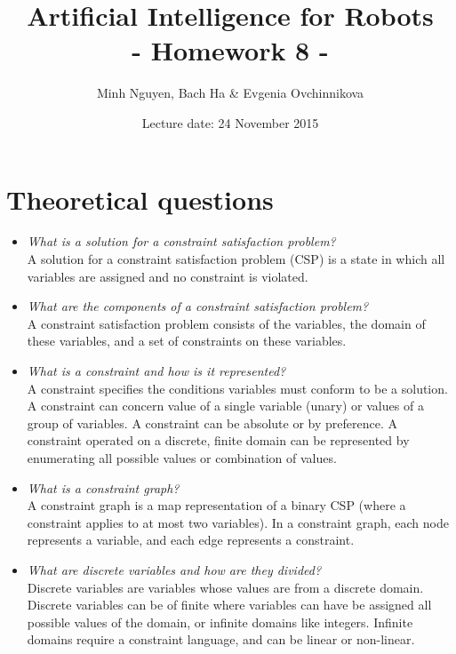 \documentclass[a4paper, 12pt]{article}
\title{Artificial Intelligence for Robots \\
				- Homework 8 -}
\author{Minh Nguyen, Bach Ha \& Evgenia Ovchinnikova}
\date{Lecture date: 24 November 2015}
\begin{document}
\maketitle

\section{Theoretical questions}

    \begin{itemize}
        \item \emph{What is a solution for a constraint satisfaction problem?}\\
            A solution for a constraint satisfaction problem (CSP) is a state in
            which all variables are assigned and no constraint is violated.
        \item \emph{What are the components of a constraint satisfaction problem?}\\
            A constraint satisfaction problem consists of the variables, the
            domain of these variables, and a set of constraints on these variables.
        \item \emph{What is a constraint and how is it represented?}\\
            A constraint specifies the conditions variables must conform to be a
            solution. A constraint can concern value of a single variable (unary)
            or values of a group of variables. A constraint can be absolute or
            by preference. A constraint operated on a discrete, finite domain
            can be represented by enumerating all possible values or combination
            of values.
        \item \emph{What is a constraint graph?}\\
            A constraint graph is a map representation of a binary CSP (where a
            constraint applies to at most two variables). In a constraint graph,
            each node represents a variable, and each edge represents a constraint.
        \item \emph{What are discrete variables and how are they divided?}\\
            Discrete variables are variables whose values are from a discrete
            domain. Discrete variables can be of finite where variables can have
            be assigned all possible values of the domain, or infinite domains
            like integers. Infinite domains require a constraint language, and
            can be linear or non-linear.

\end{itemize}
\end{document}
